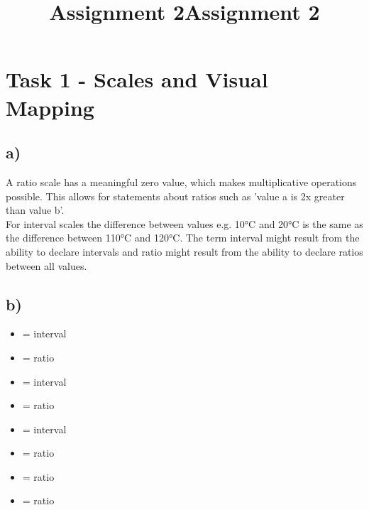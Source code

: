 \documentclass[a4paper]{article}
\date{}
\author{}
\title{Assignment 2}
\date{}
\author{}
\title{Assignment 2}
\begin{document}
	\maketitle 
	\thispagestyle{fancy}
	
	
	\section*{Task 1 - Scales and Visual Mapping}
	\subsection*{a)}
	A ratio scale has a meaningful zero value, which makes multiplicative operations possible. This allows for statements about ratios such as 'value a is 2x greater than value b'. \\For interval scales the difference between values e.g. 10°C and 20°C is the same as the difference between 110°C and 120°C. The term interval might result from the ability to declare intervals and ratio might result from the ability to declare ratios between all values.
	\subsection*{b)}
	\begin{itemize}
		\item{ = interval}
		\item{ = ratio}
		\item{ = interval}
		\item{ = ratio}
		\item{ = interval}
		\item{ = ratio}
		\item{ = ratio}
		\item{ = ratio}
	\end{itemize}
\end{document}
